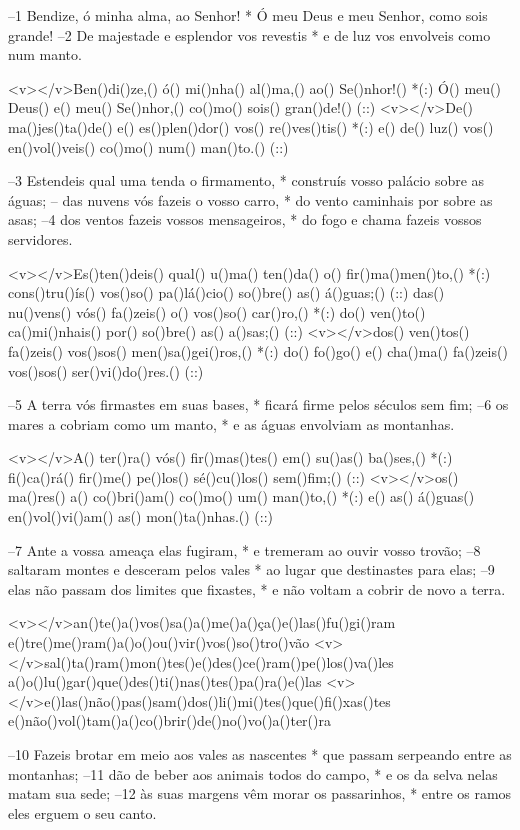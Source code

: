 –1 Bendize, ó minha alma, ao Senhor! *
Ó meu Deus e meu Senhor, como sois grande!
–2 De majestade e esplendor vos revestis *
e de luz vos envolveis como num manto.

<v></v>Ben()di()ze,() ó() mi()nha() al()ma,() ao() Se()nhor!() *(:)
Ó() meu() Deus() e() meu() Se()nhor,() co()mo() sois() gran()de!() (::)
<v></v>De() ma()jes()ta()de() e() es()plen()dor() vos() re()ves()tis() *(:)
e() de() luz() vos() en()vol()veis() co()mo() num() man()to.() (::)

–3 Estendeis qual uma tenda o firmamento, *
construís vosso palácio sobre as águas;
– das nuvens vós fazeis o vosso carro, *
do vento caminhais por sobre as asas;
–4 dos ventos fazeis vossos mensageiros, *
do fogo e chama fazeis vossos servidores.

<v></v>Es()ten()deis() qual() u()ma() ten()da() o() fir()ma()men()to,() *(:)
cons()tru()ís() vos()so() pa()lá()cio() so()bre() as() á()guas;() (::)
das() nu()vens() vós() fa()zeis() o() vos()so() car()ro,() *(:)
do() ven()to() ca()mi()nhais() por() so()bre() as() a()sas;() (::)
<v></v>dos() ven()tos() fa()zeis() vos()sos() men()sa()gei()ros,() *(:)
do() fo()go() e() cha()ma() fa()zeis() vos()sos() ser()vi()do()res.() (::)

–5 A terra vós firmastes em suas bases, *
ficará firme pelos séculos sem fim;
–6 os mares a cobriam como um manto, *
e as águas envolviam as montanhas.

<v></v>A() ter()ra() vós() fir()mas()tes() em() su()as() ba()ses,() *(:)
fi()ca()rá() fir()me() pe()los() sé()cu()los() sem()fim;() (::)
<v></v>os() ma()res() a() co()bri()am() co()mo() um() man()to,() *(:)
e() as() á()guas() en()vol()vi()am() as() mon()ta()nhas.() (::)

–7 Ante a vossa ameaça elas fugiram, *
e tremeram ao ouvir vosso trovão;
–8 saltaram montes e desceram pelos vales *
ao lugar que destinastes para elas;
–9 elas não passam dos limites que fixastes, *
e não voltam a cobrir de novo a terra.

<v></v>an()te()a()vos()sa()a()me()a()ça()e()las()fu()gi()ram
e()tre()me()ram()a()o()ou()vir()vos()so()tro()vão
<v></v>sal()ta()ram()mon()tes()e()des()ce()ram()pe()los()va()les
a()o()lu()gar()que()des()ti()nas()tes()pa()ra()e()las
<v></v>e()las()não()pas()sam()dos()li()mi()tes()que()fi()xas()tes
e()não()vol()tam()a()co()brir()de()no()vo()a()ter()ra

–10 Fazeis brotar em meio aos vales as nascentes *
que passam serpeando entre as montanhas;
–11 dão de beber aos animais todos do campo, *
e os da selva nelas matam sua sede;
–12 às suas margens vêm morar os passarinhos, *
entre os ramos eles erguem o seu canto.

